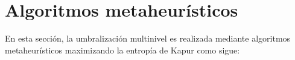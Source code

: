\documentclass[conference]{IEEEtran}
\begin{document}
















%

\section{Algoritmos metaheurísticos} \label{sec:ds}

\noindent En esta sección, la umbralización multinivel es realizada mediante algoritmos metaheurísticos maximizando la entropía de Kapur como sigue:
\end{document}

